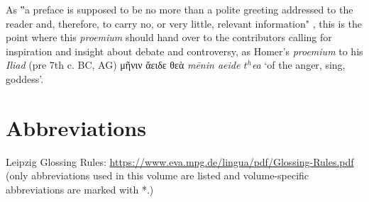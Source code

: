 \documentclass[output=paper,colorlinks,citecolor=brown]{langscibook}
\begin{document}
As ‟a preface is supposed to be no more than a polite greeting addressed to the reader and, therefore, to carry no, or very little, relevant information" \citep[1]{melcukGeneralPhraseology2023}, this is the point where this \textit{proemium} should hand over to the contributors calling for inspiration and insight about debate and controversy, as Homer’s \textit{proemium} to his \textit{Iliad} (pre 7th c. BC, AG) μῆνιν ἄειδε θεὰ \textit{mēnin aeide $t^{h}$ea} ‘of the anger, sing, goddess’.


\section*{Abbreviations}
Leipzig Glossing Rules: \url{https://www.eva.mpg.de/lingua/pdf/Glossing-Rules.pdf} (only abbreviations used in this volume are listed and volume-specific abbreviations are marked with *.) 
\bigskip
\end{document}
